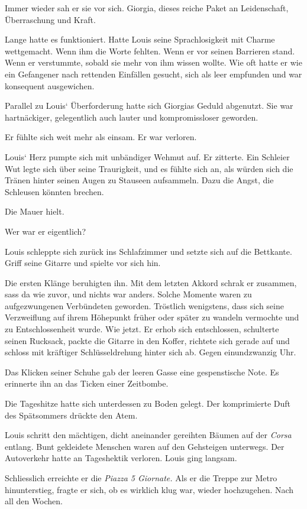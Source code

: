 Immer wieder sah er sie vor sich. Giorgia, dieses reiche Paket an
Leidenschaft, Überraschung und Kraft.

Lange hatte es funktioniert. Hatte Louis seine Sprachlosigkeit mit
Charme wettgemacht. Wenn ihm die Worte fehlten. Wenn er vor seinen
Barrieren stand. Wenn er verstummte, sobald sie mehr von ihm wissen
wollte. Wie oft hatte er wie ein Gefangener nach rettenden Einfällen
gesucht, sich als leer empfunden und war konsequent ausgewichen.

Parallel zu Louis` Überforderung hatte sich Giorgias Geduld abgenutzt.
Sie war hartnäckiger, gelegentlich auch lauter und kompromissloser
geworden.

Er fühlte sich weit mehr als einsam. Er war verloren.

Louis` Herz pumpte sich mit unbändiger Wehmut auf. Er zitterte. Ein
Schleier Wut legte sich über seine Traurigkeit, und es fühlte sich an,
als würden sich die Tränen hinter seinen Augen zu Stauseen aufsammeln.
Dazu die Angst, die Schleusen könnten brechen.

Die Mauer hielt.

Wer war er eigentlich?

Louis schleppte sich zurück ins Schlafzimmer und setzte sich auf die
Bettkante. Griff seine Gitarre und spielte vor sich hin.

Die ersten Klänge beruhigten ihn. Mit dem letzten Akkord schrak er
zusammen, sass da wie zuvor, und nichts war anders. Solche Momente waren
zu aufgezwungenen Verbündeten geworden. Tröstlich wenigstens, dass sich
seine Verzweiflung auf ihrem Höhepunkt früher oder später zu wandeln
vermochte und zu Entschlossenheit wurde. Wie jetzt. Er erhob sich
entschlossen, schulterte seinen Rucksack, packte die Gitarre in den
Koffer, richtete sich gerade auf und schloss mit kräftiger
Schlüsseldrehung hinter sich ab. Gegen einundzwanzig Uhr.

Das Klicken seiner Schuhe gab der leeren Gasse eine gespenstische Note.
Es erinnerte ihn an das Ticken einer Zeitbombe.

Die Tageshitze hatte sich unterdessen zu Boden gelegt. Der komprimierte
Duft des Spätsommers drückte den Atem.

Louis schritt den mächtigen, dicht aneinander gereihten Bäumen auf der
\emph{Corsa} entlang. Bunt gekleidete Menschen waren auf den Gehsteigen
unterwegs. Der Autoverkehr hatte an Tageshektik verloren. Louis ging
langsam.

Schliesslich erreichte er die \emph{Piazza 5 Giornate.} Als er die
Treppe zur Metro hinunterstieg, fragte er sich, ob es wirklich klug war,
wieder hochzugehen. Nach all den Wochen.


